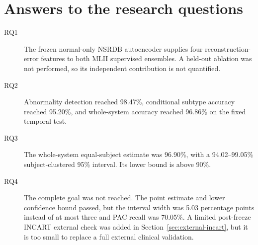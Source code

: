 

\section{Answers to the research questions}

\begin{description}
    \item[RQ1] The frozen normal-only NSRDB autoencoder supplies four
    reconstruction-error features to both MLII supervised ensembles. A held-out
    ablation was not performed, so its independent contribution is not
    quantified.
    \item[RQ2] Abnormality detection reached 98.47\%, conditional subtype
    accuracy reached 95.20\%, and whole-system accuracy reached 96.86\% on the
    fixed temporal test.
    \item[RQ3] The whole-system equal-subject estimate was 96.90\%, with a
    94.02--99.05\% subject-clustered 95\% interval. Its lower bound is above
    90\%.
    \item[RQ4] The complete goal was not reached. The point estimate and lower
    confidence bound passed, but the interval width was 5.03 percentage points
    instead of at most three and PAC recall was 70.05\%. A limited post-freeze
    INCART external check was added in Section~\ref{sec:external-incart}, but
    it is too small to replace a full external clinical validation.
\end{description}
